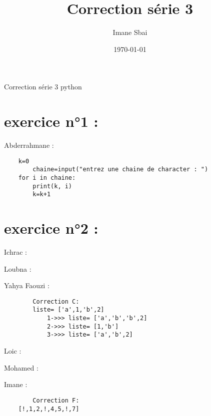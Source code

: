 \documentclass{article}
\title{Correction série 3}
\author{Imane Sbai}
\date {\today}
\begin{document}
\begin{titlepage}
    \begin{center}
Correction s\'{e}rie 3 python
    \end{center}
\end{titlepage}

\section{exercice n°1 :}
	\begin{center}
    		Abderrahmane :
	\end{center} 
	
	\begin{verbatim}
	k=0
    	chaine=input("entrez une chaine de character : ")
	for i in chaine:
   		print(k, i)
	   	k=k+1
	\end{verbatim}
\section{exercice n°2 :}

	\begin{center}
    		Ichrac :
	\end{center}
	
	
	\begin{center}
    		Loubna :
	\end{center} 
	

        \begin{center}
    		 Yahya Faouzi :
	\end{center}    	  
        	
    	\begin{verbatim}
		Correction C:
		liste= ['a',1,'b',2]
        	1->>> liste= ['a','b','b',2]
	    	2->>> liste= [1,'b']
	    	3->>> liste= ['a','b',2]
        \end{verbatim}
         
	\begin{center}
    		Loic :
	\end{center} 
	
	
	\begin{center}
    		Mohamed :
	\end{center}
	

	\begin{center}
    		Imane :
        \end{center} 
	
	\begin{verbatim}
		Correction F:
	[!,1,2,!,4,5,!,7]

	\end{verbatim}
	
\end{document}
